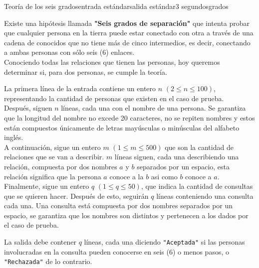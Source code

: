 \begin{problem}{Teoría de los seis grados}{entrada estándar}{salida estándar}{3 segundos}{grados}

Existe una hipótesis llamada \textbf{"Seis grados de separación"} que intenta probar que cualquier persona en la tierra puede estar conectado con otra a través de una cadena de conocidos que no tiene más de cinco intermedios, es decir, conectando a ambas personas con sólo seis (6) enlaces.\\

Conociendo todas las relaciones que tienen las personas, hoy queremos determinar si, para dos personas, se cumple la teoría.\\

\InputFile

La primera línea de la entrada contiene un entero $n$ $(2 \leq n \leq 100)$, representando la cantidad de personas que existen en el caso de prueba.\\
Después, siguen $n$ líneas, cada una con el nombre de una persona. Se garantiza que la longitud del nombre no excede 20 caracteres, no se repiten nombres y estos están compuestos únicamente de letras mayúsculas o minúsculas del alfabeto inglés.\\
\newline
A continuación, sigue un entero $m$ $(1 \leq m \leq 500)$ que son la cantidad de relaciones que se van a describir. $m$ líneas siguen, cada una describiendo una relación, compuesta por dos nombres $a$ y $b$ separados por un espacio, esta relación significa que la persona $a$ conoce a la $b$ asi como $b$ conoce a $a$.\\
\newline
Finalmente, sigue un entero $q$ $(1 \leq q \leq 50)$, que indica la cantidad de consultas que se quieren hacer. Después de esto, seguirán $q$ líneas conteniendo una consulta cada una. Una consulta está compuesta por dos nombres separados por un espacio, se garantiza que los nombres son distintos y pertenecen a los dados por el caso de prueba.\\

\OutputFile

La salida debe contener $q$ líneas, cada una diciendo \texttt{"Aceptada"} si las personas involucradas en la consulta pueden conocerse en seis (6) o menos pasos, o \texttt{"Rechazada"} de lo contrario.

\Example

\begin{example}
%
\end{example}

\end{problem}